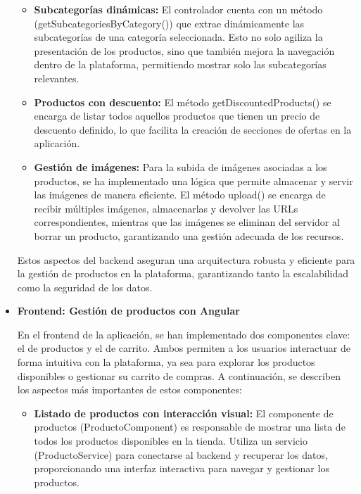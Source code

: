 \begin{itemize}
\begin{itemize}
         \item \textbf{Subcategorías dinámicas: }El controlador cuenta con un método (getSubcategoriesByCategory()) que extrae dinámicamente las subcategorías de una categoría seleccionada. Esto no solo agiliza la presentación de los productos, sino que también mejora la navegación dentro de la plataforma, permitiendo mostrar solo las subcategorías relevantes.

         \item \textbf{Productos con descuento: }El método getDiscountedProducts() se encarga de listar todos aquellos productos que tienen un precio de descuento definido, lo que facilita la creación de secciones de ofertas en la aplicación.

         \item \textbf{Gestión de imágenes: }Para la subida de imágenes asociadas a los productos, se ha implementado una lógica que permite almacenar y servir las imágenes de manera eficiente. El método upload() se encarga de recibir múltiples imágenes, almacenarlas y devolver las URLs correspondientes, mientras que las imágenes se eliminan del servidor al borrar un producto, garantizando una gestión adecuada de los recursos.
        
    \end{itemize}

    Estos aspectos del backend aseguran una arquitectura robusta y eficiente para la gestión de productos en la plataforma, garantizando tanto la escalabilidad como la seguridad de los datos.

    \vspace{0.5cm}
    
    \item \textbf{Frontend: Gestión de productos con Angular} 

    En el frontend de la aplicación, se han implementado dos componentes clave: el de productos y el de carrito. Ambos permiten a los usuarios interactuar de forma intuitiva con la plataforma, ya sea para explorar los productos disponibles o gestionar su carrito de compras. A continuación, se describen los aspectos más importantes de estos componentes:

    \begin{itemize}

    \item \textbf{Listado de productos con interacción visual: } El componente de productos (ProductoComponent) es responsable de mostrar una lista de todos los productos disponibles en la tienda. Utiliza un servicio (ProductoService) para conectarse al backend y recuperar los datos, proporcionando una interfaz interactiva para navegar y gestionar los productos.
    

\end{itemize}
\end{itemize}
